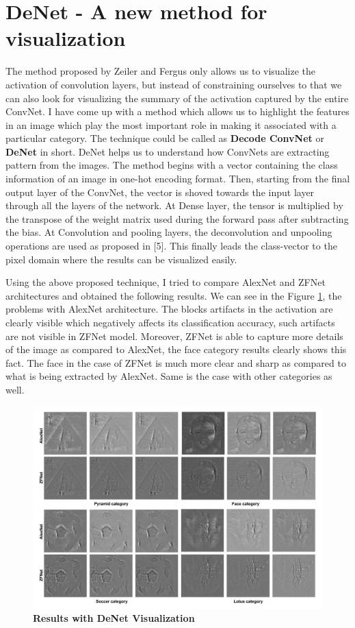 \documentclass{article} %
\begin{document}
	\section{DeNet - A new method for visualization}
	The method proposed by Zeiler and Fergus only allows us to visualize the activation of convolution layers, but instead of constraining ourselves to that we can also look for visualizing the summary of the activation captured by the entire ConvNet. I have come up with a method which allows us to highlight the features in an image which play the most important role in making it associated with a particular category. The technique could be called as \textbf{Decode ConvNet} or \textbf{DeNet} in short. DeNet helps us to understand how ConvNets are extracting pattern from the images. The method begins with a vector containing the class information of an image in one-hot encoding format. Then, starting from the final output layer of the ConvNet, the vector is shoved towards the input layer through all the layers of the network. At Dense layer, the tensor is multiplied by the transpose of the weight matrix used during the forward pass after subtracting the bias. At Convolution and pooling layers, the deconvolution and unpooling operations are used as proposed in [5]. This finally leads the class-vector to the pixel domain where the results can be visualized easily. 
	
	Using the above proposed technique, I tried to compare AlexNet and ZFNet architectures and obtained the following results. We can see in the Figure \ref{denet}, the problems with AlexNet architecture. The blocks artifacts in the activation are clearly visible which negatively affects its classification accuracy, such artifacts are not visible in ZFNet model. Moreover, ZFNet is able to capture more details of the image as compared to AlexNet, the face category results clearly shows this fact. The face in the case of ZFNet is much more clear and sharp as compared to what is being extracted by AlexNet. Same is the case with other categories as well. 
	
	\begin{figure}[!htb]
		\centering
		\includegraphics[width=14cm]{Images/denet/denet}
		\caption{\textbf{Results with DeNet Visualization}}
		\label{denet}
	\end{figure}
\end{document}
